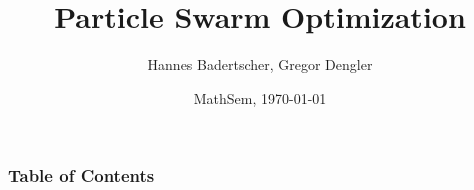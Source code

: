 \documentclass[xcolor=dvipsnames]{beamer}
\title{Particle Swarm Optimization}
\author[Badertscher, Dengler]{Hannes Badertscher, Gregor Dengler}
\date [MathSem, FS13]{MathSem, \today}
\begin{document}
	\begin{frame}
		\titlepage
	\end{frame}

	\begin{frame}
		\frametitle{Table of Contents}
		\tableofcontents[currentsection]
	\end{frame}
  
	
	
	
	
	
\end{document}
